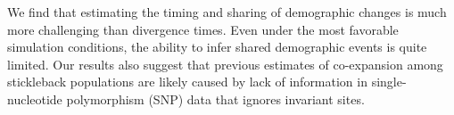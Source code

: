 We find that estimating the timing and sharing of demographic changes is much
more challenging than divergence times.
Even under the most favorable simulation conditions, the ability to infer
shared demographic events is quite limited.
Our results also suggest that previous estimates of co-expansion among
stickleback populations are likely caused by lack of information in
single-nucleotide polymorphism (SNP) data that ignores invariant sites.
